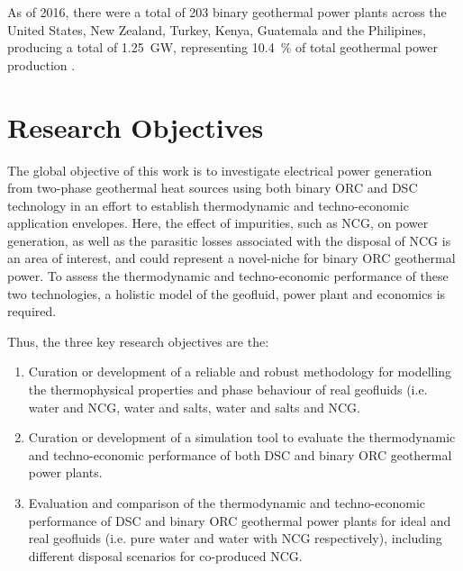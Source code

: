        As of 2016, there were a total of \num{203} binary geothermal power plants across the United States, New Zealand, Turkey, Kenya, Guatemala and the Philipines, producing a total of \qty{1.25}{\giga\watt}, representing \qty{10.4}{\percent} of total geothermal power production \cite{DiPippo2016}. 
        
        
    
    
\section{Research Objectives}
\label{sec:research_objectives}
    The global objective of this work is to investigate electrical power generation from two-phase geothermal heat sources using both binary \ac{ORC} and \ac{DSC} technology in an effort to establish thermodynamic and techno-economic application envelopes. Here, the effect of impurities, such as \ac{NCG}, on power generation, as well as the parasitic losses associated with the disposal of \ac{NCG} is an area of interest, and could represent a novel-niche for binary \ac{ORC} geothermal power. To assess the thermodynamic and techno-economic performance of these two technologies, a holistic model of the geofluid, power plant and economics is required. 

    Thus, the three key research objectives are the:
    \begin{enumerate}
        \item Curation or development of a reliable and robust methodology for modelling the thermophysical properties and phase behaviour of real geofluids (i.e. water and \ac{NCG}, water and salts, water and salts and \ac{NCG}.
        \item Curation or development of a simulation tool to evaluate the thermodynamic and techno-economic performance of both \ac{DSC} and binary \ac{ORC} geothermal power plants.
        \item Evaluation and comparison of the thermodynamic and techno-economic performance of \ac{DSC} and binary \ac{ORC} geothermal power plants for ideal and real geofluids (i.e. pure water and water with \ac{NCG} respectively), including different disposal scenarios for co-produced \ac{NCG}. 
    \end{enumerate}
    
